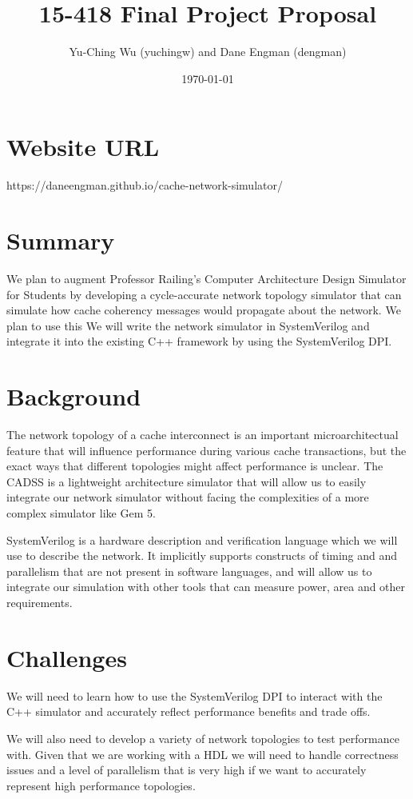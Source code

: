 \documentclass{article}
\title{15-418 Final Project Proposal}
\author{Yu-Ching Wu (yuchingw) and Dane Engman (dengman)}
\date{\today}
\begin{document}
\maketitle

\section{Website URL}
https://daneengman.github.io/cache-network-simulator/

\section{Summary}
We plan to augment Professor Railing's Computer Architecture Design Simulator for Students by developing a cycle-accurate network topology simulator that can simulate how cache coherency messages would propagate about the network. We plan to use this We will write the network simulator in SystemVerilog and integrate it into the existing
        C++ framework by using the SystemVerilog DPI.

\section{Background}
The network topology of a cache interconnect is an important microarchitectual feature that will influence performance during various cache transactions, but the exact ways that different topologies might affect performance is unclear.
The CADSS is a lightweight architecture simulator that will allow us to easily integrate our network simulator without facing the complexities of a more complex simulator like Gem 5. 

SystemVerilog is a hardware description and verification language which we will use to describe the network. It implicitly supports constructs of timing and and parallelism that are not present in software languages, and will allow us to integrate our simulation with other tools that can measure power, area and other requirements. 

\section{Challenges}
We will need to learn how to use the SystemVerilog DPI to interact with the C++ simulator and accurately reflect performance benefits and trade offs. 

We will also need to develop a variety of network topologies to test performance with. Given that we are working with a HDL we will need to handle correctness issues and a level of parallelism that is very high if we want to accurately represent high performance topologies. 
\end{document}
